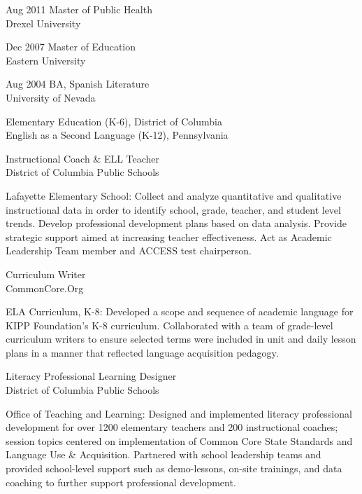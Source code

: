 \documentclass[]{scrartcl}
\begin{document}
\begin{cleanCV}

  \vspace{-0.50em}
\WorkExperience
{Aug 2011}
{Master of Public Health}
{\\Drexel University}

\WorkExperience
{Dec 2007}
{Master of Education}
{\\Eastern University}

\WorkExperience
{Aug 2004}
{BA, Spanish Literature}
{\\University of Nevada}

\vspace{-1.0em}
Elementary Education (K-6), District of Columbia\\
English as a Second Language (K-12), Pennsylvania

\vspace{0.50em}

{Instructional Coach \& ELL Teacher}
{\\District of Columbia Public Schools}

\JobDesc
{Lafayette Elementary School: }
{Collect and analyze quantitative and qualitative instructional data in order to identify school, grade, teacher, and student level trends. Develop professional development plans based on data analysis. Provide strategic support aimed at increasing teacher effectiveness. Act as Academic Leadership Team member and ACCESS test chairperson.}

{Curriculum Writer}
{\\CommonCore.Org}

\JobDesc
{ELA Curriculum, K-8: }
{Developed a scope and sequence of academic language for KIPP Foundation's K-8 curriculum. Collaborated with a team of grade-level curriculum writers to ensure selected terms were included in unit and daily lesson plans in a manner that reflected language acquisition pedagogy.}

{Literacy Professional Learning Designer}
{\\District of Columbia Public Schools}

\JobDesc
{Office of Teaching and Learning: }
{Designed and implemented literacy professional development for over 1200 elementary teachers and 200 instructional coaches; session topics centered on implementation of Common Core State Standards and Language Use \& Acquisition. Partnered with school leadership teams and provided school-level support such as demo-lessons, on-site trainings, and data coaching to further support professional development.}




\end{cleanCV}
\end{document}
